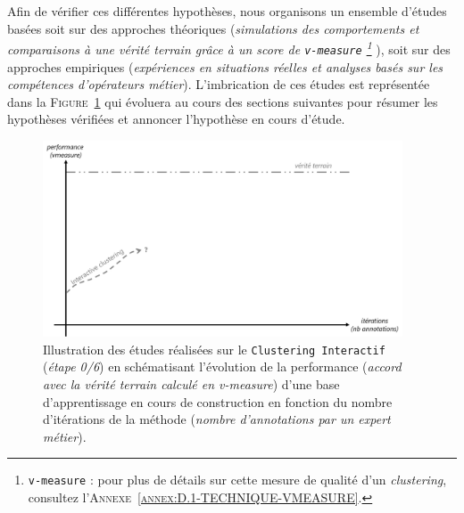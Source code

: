 	Afin de vérifier ces différentes hypothèses, nous organisons un ensemble d'études basées soit sur des approches théoriques (\textit{simulations des comportements et comparaisons à une vérité terrain grâce à un score de \texttt{v-measure} \footnote{
		\texttt{v-measure} : pour plus de détails sur cette mesure de qualité d'un \textit{clustering}, consultez l'\textsc{Annexe~\ref{annex:D.1-TECHNIQUE-VMEASURE}}.
	} }), soit sur des approches empiriques (\textit{expériences en situations réelles et analyses basés sur les compétences d'opérateurs métier}).
	L'imbrication de ces études est représentée dans la \textsc{Figure~\ref{figure:4.0-HYPOTHESE-00-DEFAULT}} qui évoluera au cours des sections suivantes pour résumer les hypothèses vérifiées et annoncer l'hypothèse en cours d'étude.
	\begin{figure}[!htb]
		\centering
		\includegraphics[width=0.95\textwidth]{figures/hypotheses-00-default}
		\caption{
			Illustration des études réalisées sur le \texttt{Clustering Interactif} (\textit{étape 0/6}) en schématisant l'évolution de la performance (\textit{accord avec la vérité terrain calculé en v-measure}) d'une base d'apprentissage en cours de construction en fonction du nombre d'itérations de la méthode (\textit{nombre d'annotations par un expert métier}).
		}
		\label{figure:4.0-HYPOTHESE-00-DEFAULT}
	\end{figure}
		
